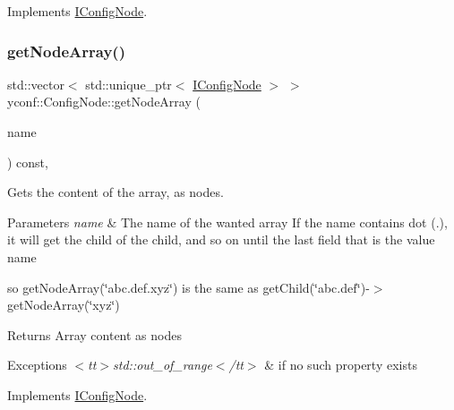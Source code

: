 Implements \hyperlink{classIConfigNode_a113e74aac6e8c62f5d5762b766f934e6}{I\+Config\+Node}.

\mbox{\label{classyconf_1_1ConfigNode_a3f590d4507699b6f9a9f3ca336f95255}} 
\subsubsection{\texorpdfstring{get\+Node\+Array()}{getNodeArray()}}
{\footnotesize\ttfamily std\+::vector$<$ std\+::unique\+\_\+ptr$<$ \hyperlink{classIConfigNode}{I\+Config\+Node} $>$ $>$ yconf\+::\+Config\+Node\+::get\+Node\+Array (\begin{DoxyParamCaption}\item[{const std\+::string \&}]{name }\end{DoxyParamCaption}) const\hspace{0.3cm}{\ttfamily [override]}, {\ttfamily [virtual]}}



Gets the content of the array, as nodes. 


\begin{DoxyParams}{Parameters}
{\em name} & The name of the wanted array If the name contains dot ({\ttfamily .}), it will get the child of the child, and so on until the last field that is the value name\\
\hline
\end{DoxyParams}
so {\ttfamily get\+Node\+Array(\char`\"{}abc.\+def.\+xyz\char`\"{})} is the same as {\ttfamily get\+Child(\char`\"{}abc.\+def\char`\"{})-\/$>$get\+Node\+Array(\char`\"{}xyz\char`\"{})}

\begin{DoxyReturn}{Returns}
Array content as nodes 
\end{DoxyReturn}

\begin{DoxyExceptions}{Exceptions}
{\em $<$tt$>$std\+::out\+\_\+of\+\_\+range$<$/tt$>$} & if no such property exists \\
\hline
\end{DoxyExceptions}


Implements \hyperlink{classIConfigNode_a3a15562e0598f5bb105ddd006e298157}{I\+Config\+Node}.

\mbox{\label{classyconf_1_1ConfigNode_a4a1ed4e489687b3f1d4d514dbf57595d}} 
